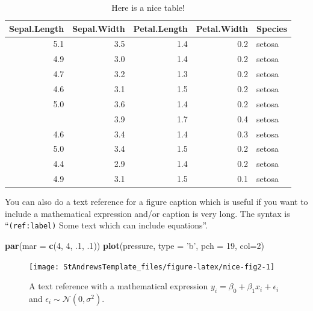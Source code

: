 \documentclass[
  oneside]{krantz}
\newenvironment{Shaded}{\begin{snugshade}}{\end{snugshade}}
\newcommand{\DataTypeTok}[1]{\textcolor[rgb]{0.13,0.29,0.53}{#1}}
\newcommand{\DecValTok}[1]{\textcolor[rgb]{0.00,0.00,0.81}{#1}}
\newcommand{\FloatTok}[1]{\textcolor[rgb]{0.00,0.00,0.81}{#1}}
\newcommand{\KeywordTok}[1]{\textcolor[rgb]{0.13,0.29,0.53}{\textbf{#1}}}
\newcommand{\NormalTok}[1]{#1}
\newcommand{\StringTok}[1]{\textcolor[rgb]{0.31,0.60,0.02}{#1}}
\theoremstyle{definition}
\theoremstyle{definition}
\theoremstyle{definition}
\theoremstyle{remark}
\begin{document}
\begin{table}

\caption{\label{tab:nice-tab}Here is a nice table!}
\centering
\begin{tabular}[t]{rrrrl}
\toprule
Sepal.Length & Sepal.Width & Petal.Length & Petal.Width & Species\\
\midrule
5.1 & 3.5 & 1.4 & 0.2 & setosa\\
4.9 & 3.0 & 1.4 & 0.2 & setosa\\
4.7 & 3.2 & 1.3 & 0.2 & setosa\\
4.6 & 3.1 & 1.5 & 0.2 & setosa\\
5.0 & 3.6 & 1.4 & 0.2 & setosa\\
\addlinespace
5.4 & 3.9 & 1.7 & 0.4 & setosa\\
4.6 & 3.4 & 1.4 & 0.3 & setosa\\
5.0 & 3.4 & 1.5 & 0.2 & setosa\\
4.4 & 2.9 & 1.4 & 0.2 & setosa\\
4.9 & 3.1 & 1.5 & 0.1 & setosa\\
\bottomrule
\end{tabular}
\end{table}

You can also do a text reference for a figure caption which is useful if you want to include a mathematical expression and/or caption is very long. The syntax is ``\texttt{(ref:label)} Some text which can include equations''.



\begin{Shaded}
\begin{Highlighting}[]
\KeywordTok{par}\NormalTok{(}\DataTypeTok{mar =} \KeywordTok{c}\NormalTok{(}\DecValTok{4}\NormalTok{, }\DecValTok{4}\NormalTok{, }\FloatTok{.1}\NormalTok{, }\FloatTok{.1}\NormalTok{))}
\KeywordTok{plot}\NormalTok{(pressure, }\DataTypeTok{type =} \StringTok{'b'}\NormalTok{, }\DataTypeTok{pch =} \DecValTok{19}\NormalTok{, }\DataTypeTok{col=}\DecValTok{2}\NormalTok{)}
\end{Highlighting}
\end{Shaded}

\begin{figure}

{\centering \texttt{[image: StAndrewsTemplate\_files/figure-latex/nice-fig2-1]} 

}

\caption{A text reference with a mathematical expression \(y_i=\beta_0 + \beta_1x_i + \epsilon_i\) and \(\epsilon_i \sim \mathcal{N}(0, \sigma^2)\).}\label{fig:nice-fig2}
\end{figure}
\end{document}
